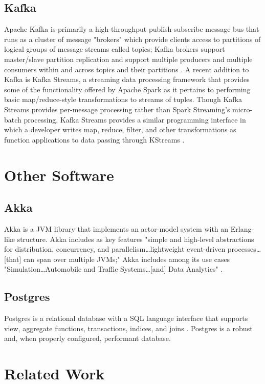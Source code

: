 \documentclass{thesis}
\begin{document}
    \subsection{Kafka}
        Apache Kafka is primarily a high-throughput publish-subscribe message bus that runs as a cluster
        of message "brokers" which provide clients access to partitions of logical groups of message streams
        called topics; Kafka brokers support master/slave partition replication and support multiple
        producers and multiple consumers within and across topics and their partitions \cite{kafka}.
        A recent addition to Kafka is Kafka Streams, a streaming data processing framework that
        provides some of the functionality offered by Apache Spark as it pertains to performing basic
        map/reduce-style transformations to streams of tuples. Though Kafka Streams provides per-message
        processing rather than Spark Streaming's micro-batch processing, Kafka Streams provides a similar
        programming interface in which a developer writes map, reduce, filter, and other
        transformations as function applications to data passing through KStreams \cite{kafka:streams}.
    \section{Other Software}
    \subsection{Akka}
        Akka is a JVM library that implements an actor-model system with an Erlang-like structure.
        Akka includes as key features "simple and high-level abstractions for distribution,
        concurrency, and parallelism\dots lightweight event-driven processes\dots[that] can span
        over multiple JVMs;" Akka includes among its use cases "Simulation\dots Automobile and
        Traffic Systems\dots [and] Data Analytics" \cite{akka}. %
    \subsection{Postgres}
        Postgres is a relational database with a SQL language interface that supports view, aggregate
        functions, transactions, indices, and joins \cite{postgres}. Postgres is a robust and, when
        properly configured, performant database.
    \section{Related Work}
\end{document}
